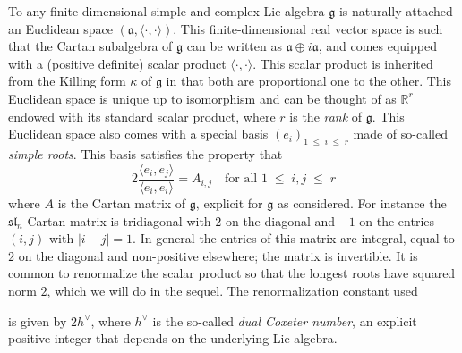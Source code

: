 \documentclass[10pt]{amsart}
\theoremstyle{definition}\newtheorem{defi}[theo]{Definition}\newtheorem{rema}[theo]{Remark}\newtheorem{exam}[theo]{Example}\newtheorem{exem}[theo]{Example}\newtheorem{nota}[theo]{Notation}
\renewcommand{\leq}{\;\leqslant\;}
\newcommand{\frksl}{\mathfrak{sl}}
\newcommand{\frkg}{\mathfrak{g}}
\newcommand{\frka}{\mathfrak{a}}
\newcommand{\R}{\mathbb{R}}
\newcommand{\ps}[1]{\langle #1 \rangle}
\begin{document}
To any finite-dimensional simple and complex Lie algebra $\frkg$ is naturally attached an Euclidean space $(\frka,\ps{\cdot,\cdot})$. This finite-dimensional real vector space is such that the Cartan subalgebra of $\frkg$ can be written as $\frka\oplus i\frka$, and comes equipped with a (positive definite) scalar product $\ps{\cdot,\cdot}$. This scalar product is inherited from the Killing form $\kappa$ of $\frkg$ in that both are proportional one to the other. This Euclidean space is unique up to isomorphism and can be thought of as $\R^r$ endowed with its standard scalar product, where $r$ is the \emph{rank} of $\frkg$. This Euclidean space also comes with a special basis $(e_i)_{1\leq i\leq r}$ made of so-called \emph{simple roots}. This basis satisfies the property that
\begin{equation}
2\frac{\ps{e_i,e_j}}{\ps{e_i,e_i}}=A_{i,j} \quad\text{for all }1\leq i,j\leq r
\end{equation}
where $A$ is the Cartan matrix of $\frkg$, explicit for $\frkg$ as considered. For instance the $\frksl_n$ Cartan matrix is tridiagonal with $2$ on the diagonal and $-1$ on the entries $(i,j)$ with $|i-j|=1$. In general the entries of this matrix are integral, equal to $2$ on the diagonal and non-positive elsewhere; the matrix is invertible. It is common to renormalize the scalar product so that the longest roots have squared norm $2$, which we will do in the sequel. The renormalization constant used

is given by $2h^\vee$, where $h^\vee$ is the so-called \emph{dual Coxeter number}, an explicit positive integer that depends on the underlying Lie algebra.
\end{document}
